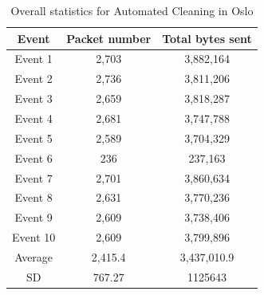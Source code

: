 \begin{table}[H]
\centering
\caption{Overall statistics for Automated Cleaning in Oslo}
\label{tab:ACoverallOSL}
\begin{tabular}{|c|c|c|}
\hline
\textbf{Event} & \textbf{Packet number} & \textbf{Total bytes sent} \\ \hline
Event 1        & 2,703                   & 3,882,164                   \\ \hline
Event 2        & 2,736                   & 3,811,206                   \\ \hline
Event 3        & 2,659                   & 3,818,287                   \\ \hline
Event 4        & 2,681                   & 3,747,788                   \\ \hline
Event 5        & 2,589                   & 3,704,329                   \\ \hline
Event 6        & 236                    & 237,163                    \\ \hline
Event 7        & 2,701                   & 3,860,634                   \\ \hline
Event 8        & 2,631                   & 3,770,236                   \\ \hline
Event 9        & 2,609                   & 3,738,406                   \\ \hline
Event 10       & 2,609                   & 3,799,896                   \\ \hline
Average        & 2,415.4                 & 3,437,010.9                 \\ \hline
SD       & 767.27
       & 1125643               \\ \hline
\end{tabular}
\end{table}

